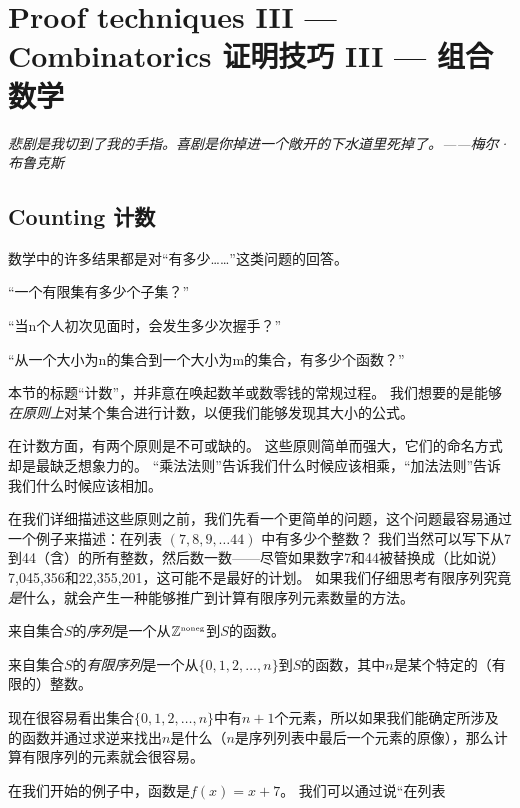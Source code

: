 \chapter{Proof techniques III --- Combinatorics 证明技巧 III --- 组合数学}
\label{ch:comb}

{\em 悲剧是我切到了我的手指。喜剧是你掉进一个敞开的下水道里死掉了。——梅尔·布鲁克斯 }


\section{Counting 计数}
\label{sec:counting}

数学中的许多结果都是对“有多少……”这类问题的回答。

\noindent “一个有限集有多少个子集？”

\noindent “当n个人初次见面时，会发生多少次握手？”

\noindent “从一个大小为n的集合到一个大小为m的集合，有多少个函数？”

本节的标题“计数”，并非意在唤起数羊或数零钱的常规过程。
我们想要的是能够\emph{在原则上}对某个集合进行计数，以便我们能够发现其大小的公式。

在计数方面，有两个原则是不可或缺的。
这些原则简单而强大，它们的命名方式却是最缺乏想象力的。
“乘法法则”告诉我们什么时候应该相乘，“加法法则”告诉我们什么时候应该相加。

在我们详细描述这些原则之前，我们先看一个更简单的问题，这个问题最容易通过一个例子来描述：在列表 $(7,8,9,\ldots 44)$ 中有多少个整数？
我们当然可以写下从7到44（含）的所有整数，然后数一数——尽管如果数字7和44被替换成（比如说）7,045,356和22,355,201，这可能不是最好的计划。
如果我们仔细思考有限序列究竟\emph{是}什么，就会产生一种能够推广到计算有限序列元素数量的方法。

\begin{defi}
来自集合$S$的\emph{序列}是一个从${\mathbb Z}^{\mbox{\tiny noneg}}$到$S$的函数。
\end{defi}

\begin{defi}
来自集合$S$的\emph{有限序列}是一个从$\{0, 1, 2, \ldots , n\}$到$S$的函数，其中$n$是某个特定的（有限的）整数。
\end{defi}

现在很容易看出集合$\{0, 1, 2, \ldots , n \}$中有$n+1$个元素，所以如果我们能确定所涉及的函数并通过求逆来找出$n$是什么（$n$是序列列表中最后一个元素的原像），那么计算有限序列的元素就会很容易。

在我们开始的例子中，函数是$f(x)=x+7$。
我们可以通过说“在列表

